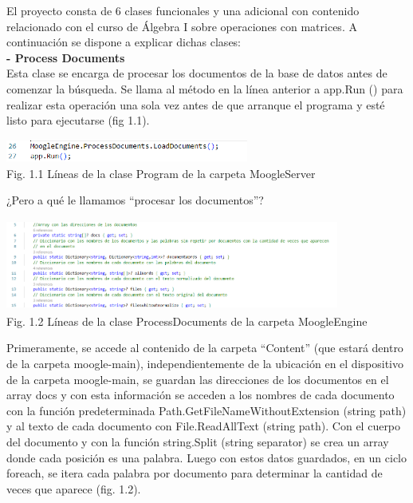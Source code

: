 \documentclass[letterpaper]{article}
\begin{document}
\newpage
{\small
El proyecto consta de 6 clases funcionales y una adicional con contenido relacionado con el
curso de Álgebra I sobre operaciones con matrices. A continuación se dispone a explicar dichas
clases:\\

\textbf{{\large- Process Documents}}\\

Esta clase se encarga de procesar los documentos de la base de datos antes de comenzar la
búsqueda. Se llama al método en la línea anterior a app.Run () para realizar esta operación una
sola vez antes de que arranque el programa y esté listo para ejecutarse (fig 1.1).

\begin{center}
	\includegraphics[width=8cm, height=0.75cm]{fig 1.1.png}\\
	{\tiny Fig. 1.1 Líneas de la clase Program de la carpeta MoogleServer}
\end{center}

{\normalsize¿Pero a qué le llamamos “procesar los documentos”?}

\begin{center}
	\includegraphics[width=11cm, height=3cm]{fig 1.2.png}\\
	{\tiny Fig. 1.2 Líneas de la clase ProcessDocuments de la carpeta MoogleEngine}
\end{center}

Primeramente, se accede al contenido de la carpeta “Content” (que estará dentro de la
carpeta moogle-main), independientemente de la ubicación en el dispositivo de la carpeta
moogle-main, se guardan las direcciones de los documentos en el array docs y con esta
información se acceden a los nombres de cada documento con la función predeterminada
Path.GetFileNameWithoutExtension (string path) y al texto de cada documento con
File.ReadAllText (string path). Con el cuerpo del documento y con la función
string.Split (string separator) se crea un array donde cada posición es una palabra. Luego
con estos datos guardados, en un ciclo foreach, se itera cada palabra por documento para
determinar la cantidad de veces que aparece (fig. 1.2).\\

}
\end{document}
